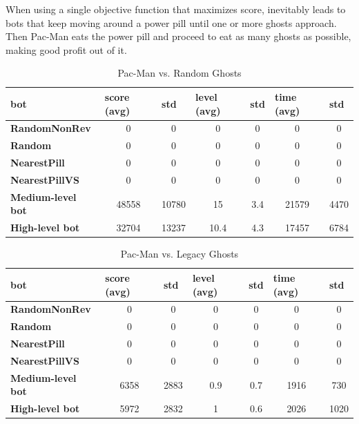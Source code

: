 \documentclass{llncs}
\newcommand{\pacman}{Ms. Pac-Man vs. Ghosts }
\newcommand{\paco}{Pac-Man }
\begin{document}
When using a single objective function that maximizes score, inevitably leads to bots that keep moving around a power pill until one or more ghosts approach. Then \paco eats the power pill and proceed to eat as many ghosts as possible, making good profit out of it.


\begin{table}[]
\centering
\caption{\paco vs. Random Ghosts}
\label{my-label}
\begin{tabular}{|l|c|c|c|c|c|c|}
\hline
\textbf{bot}           & \multicolumn{1}{l|}{\textbf{score  (avg)}} & \multicolumn{1}{l|}{\textbf{std}} & \multicolumn{1}{l|}{\textbf{level (avg)}} & \multicolumn{1}{l|}{\textbf{std}} & \multicolumn{1}{l|}{\textbf{time (avg)}} & \multicolumn{1}{l|}{\textbf{std}} \\ \hline
\textbf{RandomNonRev}     & 0 & 0 & 0 & 0 & 0 & 0 \\ \hline
\textbf{Random}           & 0 & 0 & 0 & 0 & 0 & 0 \\ \hline
\textbf{NearestPill}      & 0 & 0 & 0 & 0 & 0 & 0 \\ \hline
\textbf{NearestPillVS}    & 0 & 0 & 0 & 0 & 0 & 0 \\ \hline
\textbf{Medium-level bot} & 48558 & 10780 & 15   & 3.4 & 21579 & 4470 \\ \hline
\textbf{High-level bot}   & 32704 & 13237 & 10.4 & 4.3 & 17457 & 6784 \\ \hline
\end{tabular}
\end{table}

\begin{table}[]
\centering
\caption{\paco vs. Legacy Ghosts}
\label{my-label}
\begin{tabular}{|l|c|c|c|c|c|c|}
\hline
\textbf{bot}           & \multicolumn{1}{l|}{\textbf{score  (avg)}} & \multicolumn{1}{l|}{\textbf{std}} & \multicolumn{1}{l|}{\textbf{level (avg)}} & \multicolumn{1}{l|}{\textbf{std}} & \multicolumn{1}{l|}{\textbf{time (avg)}} & \multicolumn{1}{l|}{\textbf{std}} \\ \hline
\textbf{RandomNonRev}     & 0 & 0 & 0 & 0 & 0 & 0 \\ \hline
\textbf{Random}           & 0 & 0 & 0 & 0 & 0 & 0 \\ \hline
\textbf{NearestPill}      & 0 & 0 & 0 & 0 & 0 & 0 \\ \hline
\textbf{NearestPillVS}    & 0 & 0 & 0 & 0 & 0 & 0 \\ \hline
\textbf{Medium-level bot} & 6358 & 2883 & 0.9 & 0.7 & 1916 &  730 \\ \hline
\textbf{High-level bot}   & 5972 & 2832 & 1   & 0.6 & 2026 & 1020 \\ \hline
\end{tabular}
\end{table}
\end{document}
